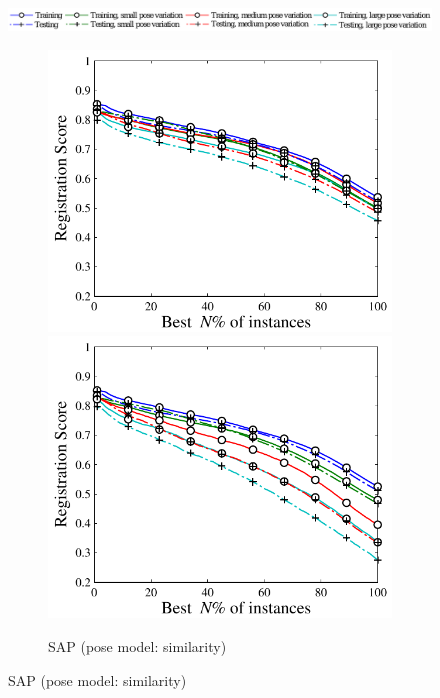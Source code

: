\begin{figure}[ht]
	\centering 
	\includegraphics[width=1\linewidth]{fig/reg/reg2d_legend.pdf}
	\begin{subfigure}[b]{0.48\linewidth}
		\includegraphics[width=\linewidth]{fig/reg/reg2d_simsim.pdf}
		\includegraphics[width=\linewidth]{fig/reg/reg2d_simaff.pdf}
		\caption{SAP (pose model: similarity)}
	\end{subfigure}

\end{figure}
